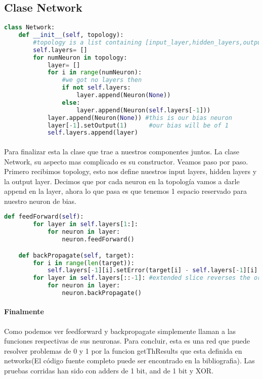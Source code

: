\subsection{Clase Network}
\begin{lstlisting}[language=Python]
class Network:
	def __init__(self, topology):
		#topology is a list containing [input_layer,hidden_layers,output_layer]
		self.layers= []
		for numNeuron in topology:
			layer= []
			for i in range(numNeuron):
				#we got no layers then
				if not self.layers:
					layer.append(Neuron(None))
				else:
					layer.append(Neuron(self.layers[-1]))
			layer.append(Neuron(None)) #this is our bias neuron
			layer[-1].setOutput(1)		#our bias will be of 1
			self.layers.append(layer)
\end{lstlisting}
\paragraph{}Para finalizar esta la clase que trae a nuestros componentes juntos. La clase Network, su aspecto mas complicado es su constructor. Veamos paso por paso. Primero recibimos topology, esto nos define nuestros input layers, hidden layers y la output layer. Decimos que por cada neuron en la topolog\'ia vamos a darle append en la layer, ahora lo que pasa es que tenemos 1 espacio reservado para nuestro neuron de bias.
\begin{lstlisting}[language=Python]
	def feedForward(self):
		for layer in self.layers[1:]:
			for neuron in layer:
				neuron.feedForward()

	def backPropagate(self, target):
		for i in range(len(target)):
			self.layers[-1][i].setError(target[i] - self.layers[-1][i].getOutput())
		for layer in self.layers[::-1]: #extended slice reverses the order of self.layers
			for neuron in layer:
				neuron.backPropagate()
\end{lstlisting}
\paragraph{Finalmente} Como podemos ver feedforward y backpropagate simplemente llaman a las funciones respectivas de sus neuronas. Para concluir, esta es una red que puede resolver problemas de 0 y 1 por la funcion getThResults que esta definida en networks(El c\'odigo fuente completo puede ser encontrado en la bibliografia). Las pruebas corridas han sido con adders de 1 bit, and de 1 bit y XOR.
